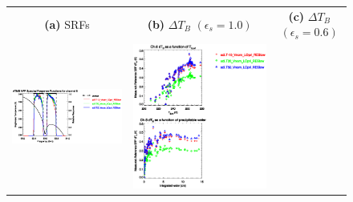 \begin{figure}[H]
  \centering
  \begin{tabular}{c c c}
    \textsf{\textbf{(a)} SRFs} &
    \textsf{\textbf{(b)} $\Delta T_B$ $(\epsilon_s = 1.0)$} &
    \textsf{\textbf{(c)} $\Delta T_B$ $(\epsilon_s = 0.6)$} \\
    \includegraphics[bb=80 400 280 558,clip,scale=0.85]{graphics/srf/Tset/atms_npp.ch6.osrf.eps} &
    \includegraphics[bb=85 400 260 558,clip,scale=0.85]{graphics/dtb/Tset/e1.0_r0.0/atms_npp.ch6.dTb.eps} & 

\end{tabular}
\end{figure}
